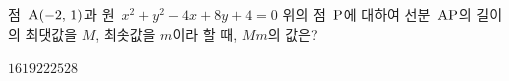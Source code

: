 점~$\mathrm{A}(-2,\,1)$과 원~$x^2+y^2-4x+8y+4=0$ 위의 점~$\mathrm{P}$에 대하여 선분~$\mathrm{AP}$의 길이의 최댓값을 $M$, 최솟값을 $m$이라 할 때, $Mm$의 값은?
\begin{choices32}{$16$}{$19$}{$22$}{$25$}{$28$}\end{choices32}
